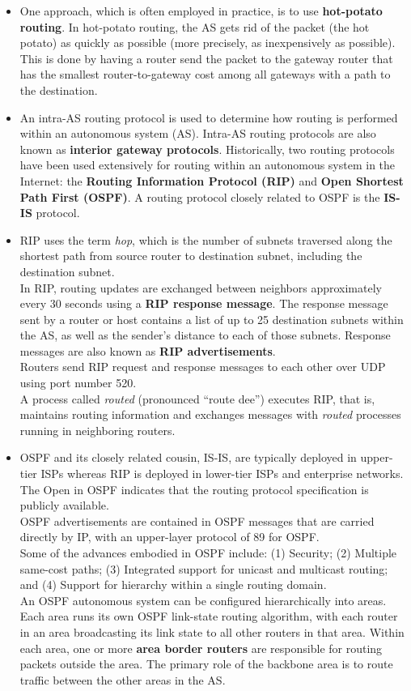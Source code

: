 \begin{itemize}
\item
One approach, which is often employed in practice, is to use \textbf{hot-potato routing}. In hot-potato routing, the AS gets rid of the packet (the hot potato) as quickly as possible (more precisely, as inexpensively as possible). This is done by having a router send the packet to the gateway router that has the smallest router-to-gateway cost among all gateways with a path to the destination.

\item
An intra-AS routing protocol is used to determine how routing is performed within an autonomous system (AS). Intra-AS routing protocols are also known as \textbf{interior gateway protocols}. Historically, two routing protocols have been used extensively for routing within an autonomous system in the Internet: the \textbf{Routing Information Protocol (RIP)} and \textbf{Open Shortest Path First (OSPF)}. A routing protocol closely related to OSPF is the \textbf{IS-IS} protocol.

\item
RIP uses the term \textit{hop}, which is the number of subnets traversed along the shortest path from source router to destination subnet, including the destination subnet.\\
In RIP, routing updates are exchanged between neighbors approximately every 30 seconds using a \textbf{RIP response message}. The response message sent by a router or host contains a list of up to 25 destination subnets within the AS, as well as the sender's distance to each of those subnets. Response messages are also known as \textbf{RIP advertisements}.\\
Routers send RIP request and response messages to each other over UDP using port number 520.\\
A process called \textit{routed} (pronounced ``route dee'') executes RIP, that is, maintains routing information and exchanges messages with \textit{routed} processes running in neighboring routers.

\item
OSPF and its closely related cousin, IS-IS, are typically deployed in upper-tier ISPs whereas RIP is deployed in lower-tier ISPs and enterprise networks. The Open in OSPF indicates that the routing protocol specification is publicly available.\\
OSPF advertisements are contained in OSPF messages that are carried directly by IP, with an upper-layer protocol of 89 for OSPF.\\
Some of the advances embodied in OSPF include: (1) Security; (2) Multiple same-cost paths; (3) Integrated support for unicast and multicast routing; and (4) Support for hierarchy within a single routing domain.\\
An OSPF autonomous system can be configured hierarchically into areas. Each area runs its own OSPF link-state routing algorithm, with each router in an area broadcasting its link state to all other routers in that area. Within each area, one or more \textbf{area border routers} are responsible for routing packets outside the area. The primary role of the backbone area is to route traffic between the other areas in the AS.


\end{itemize}
